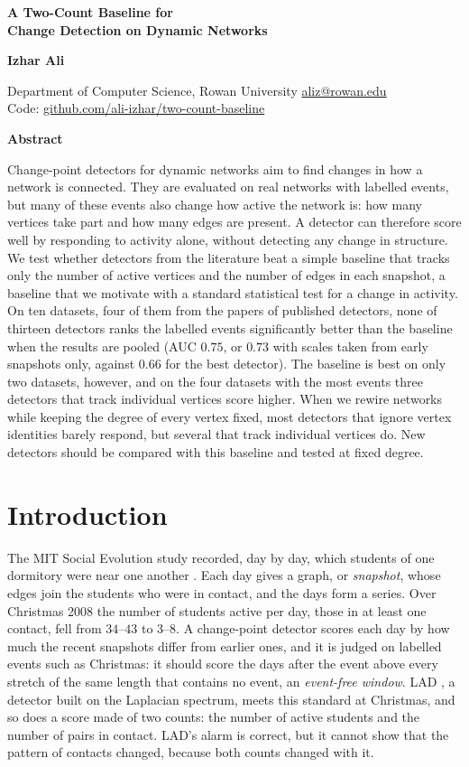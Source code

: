 \documentclass[11pt]{article}
\makeatletter
\newif\ifanon
\theoremstyle{dsplain}
\theoremstyle{definition}
\newcommand{\dstitle}{%
  \thispagestyle{plain}%
  \begin{flushleft}
    {\sffamily\fontsize{19.5}{25}\selectfont\bfseries\color{dsnavy}A Two-Count Baseline for\\[2pt]
     \color{dsblue}Change Detection on Dynamic Networks\par}
    \vspace{12pt}
    \ifanon
    {\sffamily\normalsize\bfseries Anonymous authors}\par\vspace{2pt}
    {\sffamily\small\color{dsgrey}Paper under double-blind review}\par
    \else
    {\sffamily\normalsize\bfseries Izhar Ali}\par\vspace{2pt}
    {\sffamily\small\color{dsgrey}Department of Computer Science, Rowan University\quad
     \href{mailto:aliz@rowan.edu}{aliz@rowan.edu}\\
     Code: \href{https://github.com/ali-izhar/two-count-baseline}{github.com/ali-izhar/two-count-baseline}}\par
    \fi
    \vspace{6pt}
  \end{flushleft}\vspace{2pt}}
\renewenvironment{abstract}{%
  \begin{tcolorbox}[enhanced, colback=dstint, colframe=dstint, boxrule=0pt, arc=1.5pt, left=12pt, right=12pt,
    top=9pt, bottom=9pt, borderline west={2.4pt}{0pt}{dsblue}]
  {\sffamily\small\bfseries\color{dsnavy}Abstract}\par\vspace{4pt}\small}{\end{tcolorbox}\vspace{4pt}}
\makeatother
\begin{document}
\dstitle

\begin{abstract}
Change-point detectors for dynamic networks aim to find changes in how a network is connected. They are
evaluated on real networks with labelled events, but many of these events also change how active the
network is: how many vertices take part and how many edges are present. A detector can therefore score
well by responding to activity alone, without detecting any change in structure. We test whether detectors 
from the literature beat a simple baseline that tracks only the number of active vertices and the number of 
edges in each snapshot, a baseline that we motivate with a standard statistical test for a change in 
activity. On ten datasets, four of them from the papers of published detectors, none of thirteen detectors 
ranks the labelled events significantly better than the baseline when the results are pooled (AUC $0.75$, 
or $0.73$ with scales taken from early snapshots only, against $0.66$ for the best detector). The baseline is best on only two datasets, however, and on the four 
datasets with the most events three detectors that track individual vertices score higher. When we rewire 
networks while keeping the degree of every vertex fixed, most detectors that ignore vertex identities barely 
respond, but several that track individual vertices do. New detectors should be compared with this baseline 
and tested at fixed degree.
\end{abstract}

\section{Introduction}
\label{sec:intro}

The MIT Social Evolution study recorded, day by day, which students of one dormitory were near one
another \citep{madan2012sensing}. Each day gives a graph, or \emph{snapshot}, whose edges join the
students who were in contact, and the days form a series. Over Christmas 2008 the number of students
active per day, those in at least one contact, fell from $34$--$43$ to $3$--$8$. A change-point detector
scores each day by how much the recent snapshots differ from earlier ones, and it is judged on labelled
events such as Christmas: it should score the days after the event above every stretch of the same length
that contains no event, an \emph{event-free window}. LAD \citep{huang2020laplacian}, a detector built on
the Laplacian spectrum, meets this standard at Christmas, and so does a score made of two counts: the
number of active students and the number of pairs in contact. LAD's alarm is correct, but it cannot show 
that the pattern of contacts changed, because both counts changed with it.
\end{document}
